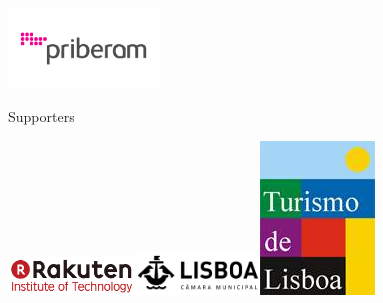 \begin{center}
\quad{}\includegraphics[width=0.3\textwidth]{content/images/logos/priberam}\hfill{}\hfill{}
\par\end{center}

\vfill{}


\noindent 

\noindent Supporters

\begin{center}
\quad{}\includegraphics[width=0.25\textwidth]{content/images/logos/rakuten-www}\hfill{}\hfill{}\includegraphics[width=0.25\textwidth]{content/images/logos/cml-www}\hfill{}\includegraphics[height=0.06\textheight]{content/images/logos/turismo-lisboa-www}
\par\end{center}

